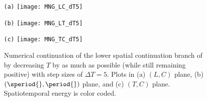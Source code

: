 \begin{itemize}
\begin{figure}
\begin{minipage}[height=.20\textheight]{.30\textwidth}
\centering \small{\texttt{(a)}}
\texttt{[image: MNG\_LC\_dT5]}
\end{minipage}
\begin{minipage}[height=.20\textheight]{.30\textwidth}
\centering \small{\texttt{(b)}}
\texttt{[image: MNG\_LT\_dT5]}
\end{minipage}
\begin{minipage}[height=.20\textheight]{.30\textwidth}
\centering \small{\texttt{(c)}}
\texttt{[image: MNG\_TC\_dT5]}
\end{minipage}
\caption{ \label{fig:MNG_lower_dT5}
Numerical continuation of the lower spatial continuation branch of
 by decreasing $T$ by as much as possible
(while still remaining positive) with step
sizes of $\Delta T = 5$. Plots in (a) $(L,C)$ plane, (b) $(\speriod{},\period{})$ plane, and
(c) $(T,C)$ plane. Spatiotemporal energy is color coded.
}
\end{figure}


\end{itemize}
